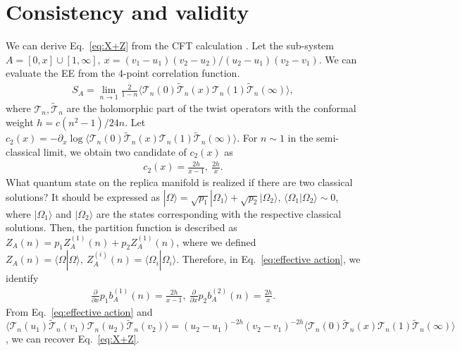 \documentclass[%
 reprint,
 amsmath,amssymb,
 aps,
]{revtex4-2}
\begin{document}
\section{\label{sec:4} Consistency and validity}
    
    
    We can derive Eq.~\eqref{eq:X+Z} from the CFT calculation \cite{Hartman:2013mia, Faulkner:2013yia}. Let the sub-system $A = [0,x]\cup[1,\infty],\ x=(v_1-u_1)(v_2-u_2)/(u_2-u_1)(v_2-v_1)$. We can evaluate the EE from the $4$-point correlation function.
\begin{align}
    S_A = \lim_{n \to 1} \frac{2}{1-n}\langle \mathcal{T}_n(0)\mathcal{\tilde{T}}_n(x)\mathcal{T}_n(1)\mathcal{\tilde{T}}_n(\infty) \rangle, 
\end{align}
    where $\mathcal{T}_n, \mathcal{\tilde{T}}_n$ are the holomorphic part of the twist operators with the conformal weight $h = c(n^2-1)/24n$. Let $c_2(x) = -\partial_x \log \langle \mathcal{T}_n(0)\mathcal{\tilde{T}}_n(x)\mathcal{T}_n(1)\mathcal{\tilde{T}}_n(\infty) \rangle$. For $n \sim 1$ in the semi-classical limit, we obtain two candidate of $c_2(x)$ as
\begin{align}
    c_2(x) = \frac{2h}{x-1},\ \frac{2h}{x}.
\end{align}
    What quantum state on the replica manifold is realized if there are two classical solutions? It should be expressed as $|\Omega\rangle = \sqrt{p_1} |\Omega_1\rangle  + \sqrt{p_2} |\Omega_2\rangle$, $\langle \Omega_1|\Omega_2\rangle \sim 0$, where $|\Omega_1\rangle$ and $|\Omega_2\rangle$ are the states corresponding with the respective classical solutions. Then, the partition function is described as $Z_A(n) = p_1 Z^{(1)}_A(n) + p_2 Z^{(1)}_A(n)$, where we defined $Z_A(n) = \langle \Omega|\Omega\rangle,\ Z^{(i)}_A(n) = \langle \Omega_i|\Omega_i\rangle$. Therefore, in Eq.~\eqref{eq:effective action}, we identify 
\begin{align}
    \frac{\partial}{\partial x} p_1 b^{(1)}_A(n) = \frac{2h}{x-1},\ \frac{\partial}{\partial x} p_2 b^{(2)}_A(n) = \frac{2h}{x}.
\end{align}
    From Eq.~\eqref{eq:effective action} and $\langle \mathcal{T}_n(u_1)\mathcal{\tilde{T}}_n(v_1)\mathcal{T}_n(u_2)\mathcal{\tilde{T}}_n(v_2) \rangle = (u_2-u_1)^{-2h}(v_2-v_1)^{-2h}\langle \mathcal{T}_n(0)\mathcal{\tilde{T}}_n(x)\mathcal{T}_n(1)\mathcal{\tilde{T}}_n(\infty) \rangle$, we can recover Eq.~\eqref{eq:X+Z}.
\end{document}
